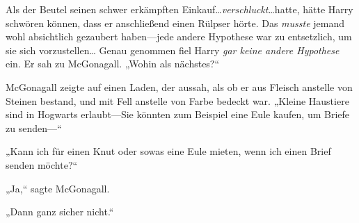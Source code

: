 Als der Beutel seinen schwer erkämpften Einkauf…\emph{verschluckt}…hatte, hätte Harry schwören können, dass er anschließend einen Rülpser hörte. Das \emph{musste} jemand wohl absichtlich gezaubert haben—jede andere Hypothese war zu entsetzlich, um sie sich vorzustellen… Genau genommen fiel Harry \emph{gar keine andere Hypothese} ein. Er sah zu McGonagall. „Wohin als nächstes?“

McGonagall zeigte auf einen Laden, der aussah, als ob er aus Fleisch anstelle von Steinen bestand, und mit Fell anstelle von Farbe bedeckt war. „Kleine Haustiere sind in Hogwarts erlaubt—Sie könnten zum Beispiel eine Eule kaufen, um Briefe zu senden—“

„Kann ich für einen Knut oder sowas eine Eule mieten, wenn ich einen Brief senden möchte?“

„Ja,“ sagte McGonagall.

„Dann ganz sicher nicht.“

